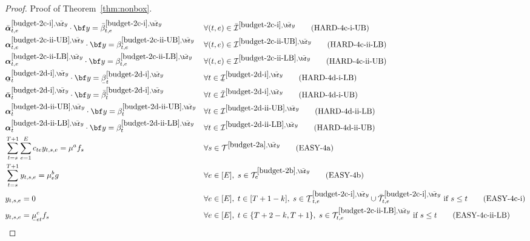 \documentclass[nonblindrev,mnsc]{informs3} %
\newcommand{\by}{{\bf y}}
\newcommand{\balpha}{{\boldsymbol{\alpha}}}
\newcommand{\ubar}[1]{\text{\b{$#1$}}}
\begin{document}
\begin{APPENDICES}
\begin{proof}{Proof of Theorem~\ref{thm:nonbox}.}
\begin{align}
&\bar{\balpha}^{\ref{budget-2c-i},\bar{\by}}_{t,e} \cdot \by = \bar{\beta}^{\ref{budget-2c-i},\bar{\by}}_{t,e} && \forall (t,e) \in  \bar{\mathcal{I}}^{\ref{budget-2c-i},\bar{\by}}  \tag{HARD-4c-i-UB} \label{line:budget_hard_5c_ub}\\
&{\balpha}^{\ref{budget-2c-ii-UB},\bar{\by}}_{t,e} \cdot \by = {\beta}^{\ref{budget-2c-ii-UB},\bar{\by}}_{t,e} && \forall (t,e) \in  {\mathcal{I}}^{\ref{budget-2c-ii-UB},\bar{\by}}  \tag{HARD-4c-ii-LB} \label{line:budget_hard_5c_ii_lb}\\
&{\balpha}^{\ref{budget-2c-ii-LB},\bar{\by}}_{t,e} \cdot \by = {\beta}^{\ref{budget-2c-ii-LB},\bar{\by}}_{t,e} && \forall (t,e) \in  {\mathcal{I}}^{\ref{budget-2c-ii-LB},\bar{\by}}  \tag{HARD-4c-ii-UB} \label{line:budget_hard_5c_ii_ub}\\
&\ubar{\balpha}^{\ref{budget-2d-i},\bar{\by}}_{t} \cdot \by = \ubar{\beta}^{\ref{budget-2d-i},\bar{\by}}_{t} && \forall t \in  \ubar{\mathcal{I}}^{\ref{budget-2d-i},\bar{\by}}  \tag{HARD-4d-i-LB} \label{line:budget_hard_5d_lb}\\
&\bar{\balpha}^{\ref{budget-2d-i},\bar{\by}}_{t} \cdot \by = \bar{\beta}^{\ref{budget-2d-i},\bar{\by}}_{t} && \forall t \in  \bar{\mathcal{I}}^{\ref{budget-2d-i},\bar{\by}} 
\tag{HARD-4d-i-UB} \label{line:budget_hard_5d_ub}\\
&{\balpha}^{\ref{budget-2d-ii-UB},\bar{\by}}_{t} \cdot \by = {\beta}^{\ref{budget-2d-ii-UB},\bar{\by}}_{t} && \forall t \in  {\mathcal{I}}^{\ref{budget-2d-ii-UB},\bar{\by}}  \tag{HARD-4d-ii-LB} \label{line:budget_hard_5d_ii_lb}\\
&{\balpha}^{\ref{budget-2d-ii-LB},\bar{\by}}_{t} \cdot \by = {\beta}^{\ref{budget-2d-ii-LB},\bar{\by}}_{t} && \forall t \in  {\mathcal{I}}^{\ref{budget-2d-ii-LB},\bar{\by}} 
\tag{HARD-4d-ii-UB} \label{line:budget_hard_5d_ii_ub}\\
&\sum_{t=s}^{T+1} \sum_{e=1}^E  c_{te} y_{t,s,e} = \mu^a f_s && \forall s \in \mathcal{T}^{\ref{budget-2a},\bar{\by}}\tag{EASY-4a} \label{line:budget_easy_5a}\\
& \sum_{t=s}^{T+1} y_{t,s,e} =\mu^b_e g && \forall e \in[E], \; s \in \mathcal{T}^{\ref{budget-2b},\bar{\by}}_e\tag{EASY-4b} \label{line:budget_easy_5b}\\
&y_{t,s,e} =0 && \forall e \in[E], \; t \in[T+1-k], \; s \in  \ubar{\mathcal{T}}^{\ref{budget-2c-i},\bar{\by}}_{t,e}  \cup \bar{\mathcal{T}}^{\ref{budget-2c-i},\bar{\by}}_{t,e} \text{ if } s \le t \tag{EASY-4c-i} \label{line:budget_easy_5c_i}\\
&y_{t,s,e} =\ubar{\mu}^c_{et}f_s && \forall e \in[E], \; t \in\{T+2-k,T+1\}, \; s \in  {\mathcal{T}}^{\ref{budget-2c-ii-LB},\bar{\by}}_{t,e}   \text{ if } s \le t \tag{EASY-4c-ii-LB} \label{line:budget_easy_5c_ii_LB}\\

\end{align}
\end{proof}
\end{APPENDICES}
\end{document}
